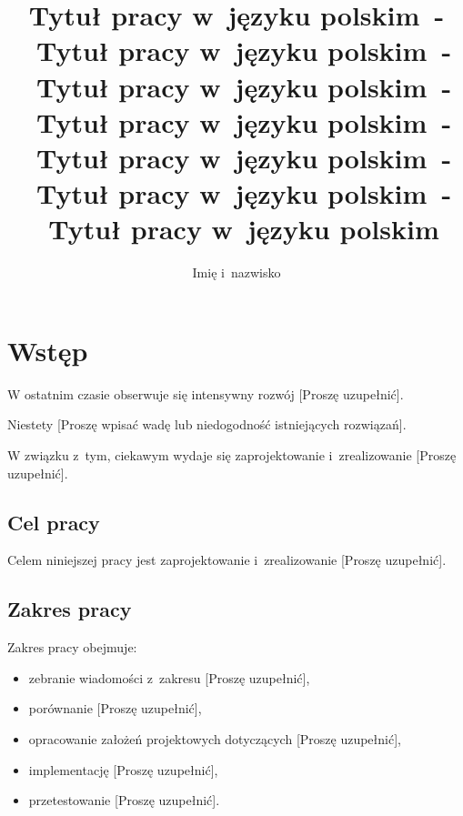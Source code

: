 \documentclass{PracaDyplomowa-Szablon}
\author{Imię i~nazwisko}
\title{Tytuł pracy w~języku polskim~-~Tytuł pracy w~języku polskim~-~Tytuł pracy w~języku polskim~-~Tytuł pracy w~języku polskim~-~Tytuł pracy w~języku polskim~-~Tytuł pracy w~języku polskim~-~Tytuł pracy w~języku polskim}
\begin{document}
\frontpage
\tableofcontents

\cleardoublepage %
\chapter*{Wstęp}


W ostatnim czasie obserwuje się intensywny rozwój [Proszę uzupełnić].

Niestety [Proszę wpisać wadę lub niedogodność istniejących rozwiązań].

W związku z~tym, ciekawym wydaje się zaprojektowanie i~zrealizowanie [Proszę uzupełnić].

\section*{Cel pracy}


Celem niniejszej pracy jest zaprojektowanie i~zrealizowanie [Proszę uzupełnić].

\section*{Zakres pracy}

Zakres pracy obejmuje:

\begin{itemize}
\item zebranie wiadomości z~zakresu [Proszę uzupełnić],

\item porównanie [Proszę uzupełnić],

\item opracowanie założeń projektowych dotyczących [Proszę uzupełnić],

\item implementację [Proszę uzupełnić],

\item przetestowanie [Proszę uzupełnić].
\end{itemize}
\end{document}
